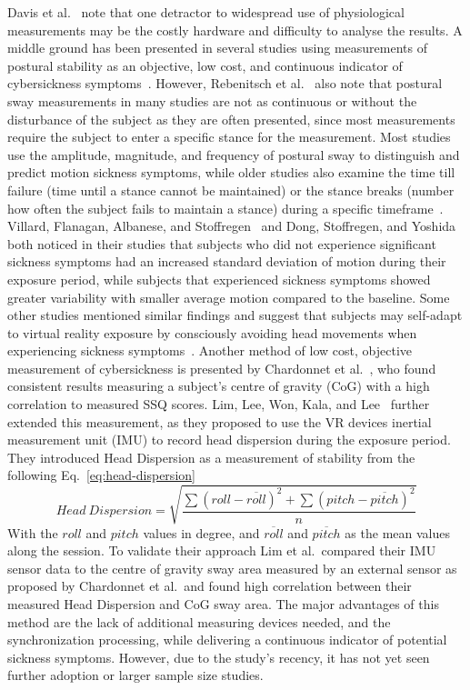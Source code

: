 Davis et al.~\cite{Davis2014} note that one detractor to widespread use of physiological measurements may be the
costly hardware and difficulty to analyse the results.
A middle ground has been presented in several studies using measurements of postural stability as an objective, low
cost, and continuous indicator of cybersickness symptoms~\cite{Rebenitsch2016}.
However, Rebenitsch et al.~\cite{Rebenitsch2016} also note that postural sway measurements in many studies are not as
continuous or without the disturbance of the subject as they are often presented, since most measurements require the
subject to enter a specific stance for the measurement.
Most studies use the amplitude, magnitude, and frequency of postural sway to distinguish and predict motion sickness
symptoms, while older studies also examine the time till failure (time until a stance cannot be maintained) or the
stance breaks (number how often the subject fails to maintain a stance) during a specific
timeframe~\cite{Rebenitsch2016}.
Villard, Flanagan, Albanese, and Stoffregen~\cite{Villard2008} and Dong, Stoffregen, and
Yoshida~\cite{Dong2011, Dong2010} both noticed in their studies that subjects who did not experience significant
sickness symptoms had an increased standard deviation of motion during their exposure period, while subjects that
experienced sickness symptoms showed greater variability with smaller average motion compared to the baseline.
Some other studies mentioned similar findings and suggest that subjects may self-adapt to virtual reality exposure by
consciously avoiding head movements when experiencing sickness symptoms~\cite{Rebenitsch2016}.
Another method of low cost, objective measurement of cybersickness is presented by Chardonnet et
al.~\cite{Chardonnet2015}, who found consistent results measuring a subject's centre of gravity (CoG) with a high
correlation to measured SSQ scores.
Lim, Lee, Won, Kala, and Lee~\cite{Lim2020} further extended this measurement, as they proposed to use the VR devices
inertial measurement unit (IMU) to record head dispersion during the exposure period.
They introduced Head Dispersion as a measurement of stability from the following Eq.~\ref{eq:head-dispersion}
\begin{equation}
    \label{eq:head-dispersion}
    Head\ Dispersion = \sqrt{\frac{\sum(roll - \overline{roll})^2 + \sum{(pitch - \overline{pitch})^2}} {n}}
\end{equation}
With the $roll$ and $pitch$ values in degree, and $\overline{roll}$ and $\overline{pitch}$ as the mean values along
the session.
To validate their approach Lim et al.\ compared their IMU sensor data to the centre of gravity sway area measured by an
external sensor as proposed by Chardonnet et al.\ and found high correlation between their measured Head Dispersion
and CoG sway area.
The major advantages of this method are the lack of additional measuring devices needed, and the synchronization
processing, while delivering a continuous indicator of potential sickness symptoms.
However, due to the study's recency, it has not yet seen further adoption or larger sample size studies.



